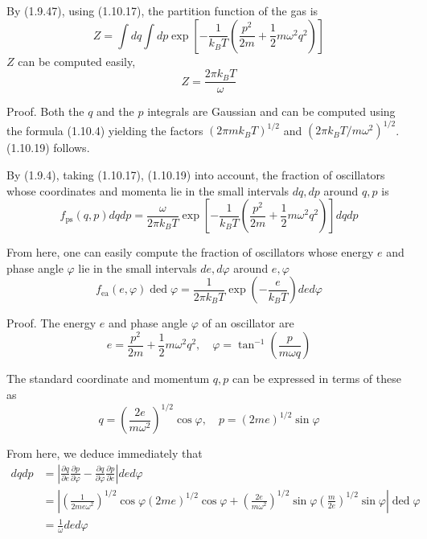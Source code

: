 \documentclass{article}
\begin{document}
By (1.9.47), using (1.10.17), the partition function of the gas is
$$
\begin{equation*}
Z=\int d q \int d p \exp \left[-\frac{1}{k_{B} T}\left(\frac{p^{2}}{2 m}+\frac{1}{2} m \omega^{2} q^{2}\right)\right] \tag{1.10.18}
\end{equation*}
$$
$Z$ can be computed easily,
$$
\begin{equation*}
Z=\frac{2 \pi k_{B} T}{\omega} \tag{1.10.19}
\end{equation*}
$$

Proof. Both the $q$ and the $p$ integrals are Gaussian and can be computed using the formula (1.10.4) yielding the factors $\left(2 \pi m k_{B} T\right)^{1 / 2}$ and $\left(2 \pi k_{B} T / m \omega^{2}\right)^{1 / 2}$. (1.10.19) follows.

By (1.9.4), taking (1.10.17), (1.10.19) into account, the fraction of oscillators whose coordinates and momenta lie in the small intervals $d q, d p$ around $q, p$ is
$$
\begin{equation*}
f_{\mathrm{ps}}(q, p) d q d p=\frac{\omega}{2 \pi k_{B} T} \exp \left[-\frac{1}{k_{B} T}\left(\frac{p^{2}}{2 m}+\frac{1}{2} m \omega^{2} q^{2}\right)\right] d q d p \tag{1.10.20}
\end{equation*}
$$

From here, one can easily compute the fraction of oscillators whose energy $e$ and phase angle $\varphi$ lie in the small intervals $d e, d \varphi$ around $e, \varphi$
$$
\begin{equation*}
f_{\mathrm{ea}}(e, \varphi) \operatorname{ded} \varphi=\frac{1}{2 \pi k_{B} T} \exp \left(-\frac{e}{k_{B} T}\right) d e d \varphi \tag{1.10.21}
\end{equation*}
$$

Proof. The energy $e$ and phase angle $\varphi$ of an oscillator are
$$
\begin{equation*}
e=\frac{p^{2}}{2 m}+\frac{1}{2} m \omega^{2} q^{2}, \quad \varphi=\tan ^{-1}\left(\frac{p}{m \omega q}\right) \tag{1.10.22}
\end{equation*}
$$

The standard coordinate and momentum $q, p$ can be expressed in terms of these as
$$
\begin{equation*}
q=\left(\frac{2 e}{m \omega^{2}}\right)^{1 / 2} \cos \varphi, \quad p=(2 m e)^{1 / 2} \sin \varphi \tag{1.10.23}
\end{equation*}
$$

From here, we deduce immediately that
$$
\begin{align*}
d q d p & =\left|\frac{\partial q}{\partial e} \frac{\partial p}{\partial \varphi}-\frac{\partial q}{\partial \varphi} \frac{\partial p}{\partial e}\right| d e d \varphi  \tag{1.10.24}\\
& =\left|\left(\frac{1}{2 m e \omega^{2}}\right)^{1 / 2} \cos \varphi(2 m e)^{1 / 2} \cos \varphi+\left(\frac{2 e}{m \omega^{2}}\right)^{1 / 2} \sin \varphi\left(\frac{m}{2 e}\right)^{1 / 2} \sin \varphi\right| \operatorname{ded} \varphi \\
& =\frac{1}{\omega} d e d \varphi
\end{align*}
$$
\end{document}
